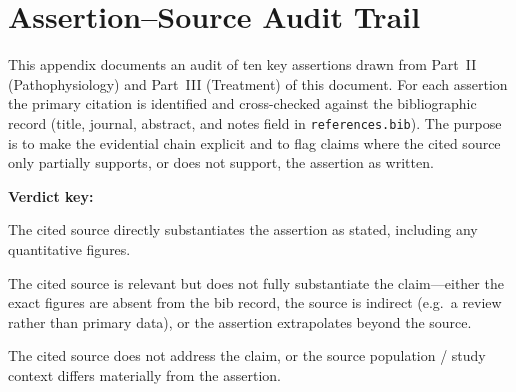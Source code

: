 %
%
\chapter{Assertion--Source Audit Trail}
\label{app:assertion-audit}

This appendix documents an audit of ten key assertions drawn from Part~II
(Pathophysiology) and Part~III (Treatment) of this document.  For each
assertion the primary citation is identified and cross-checked against the
bibliographic record (title, journal, abstract, and notes field in
\texttt{references.bib}).  The purpose is to make the evidential chain
explicit and to flag claims where the cited source only partially supports,
or does not support, the assertion as written.

\medskip

\noindent\textbf{Verdict key:}
\begin{description}[noitemsep]
  \item[SUPPORTS] The cited source directly substantiates the assertion as
    stated, including any quantitative figures.
  \item[PARTIALLY SUPPORTS] The cited source is relevant but does not fully
    substantiate the claim---either the exact figures are absent from the
    bib record, the source is indirect (e.g.\ a review rather than primary
    data), or the assertion extrapolates beyond the source.
  \item[DOES NOT SUPPORT] The cited source does not address the claim, or
    the source population / study context differs materially from the
    assertion.
\end{description}

\bigskip


